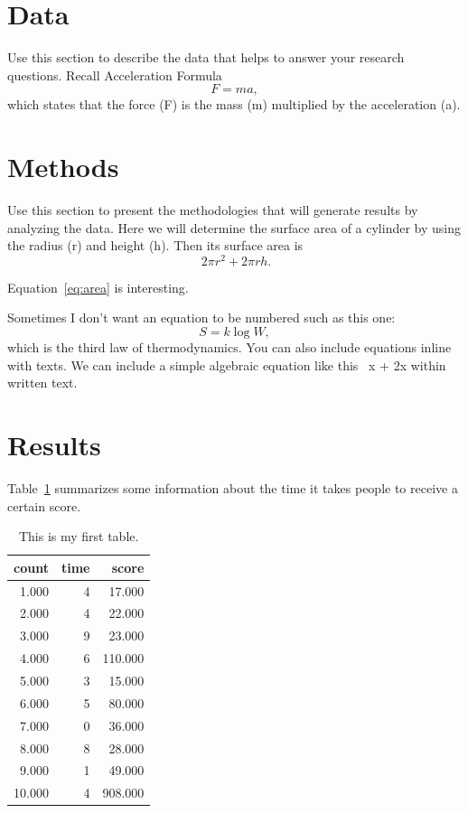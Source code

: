 \documentclass[12pt]{article}
\begin{document}
\section{Data}
\label{sec:data}

Use this section to describe the data that helps to answer your research
questions. Recall Acceleration Formula
\begin{equation}
  \label{eq:mc2}
  F = ma,
\end{equation}
which states that the force (F) is the mass (m) multiplied by the acceleration (a).

\section{Methods}
\label{sec:meth}

Use this section to present the methodologies that will generate results by
analyzing the data. Here we will determine the surface area of a cylinder by using the radius (r) and height (h). Then its surface area is
\begin{equation}
  \label{eq:area}
  \ 2\pi r^2 + 2\pi rh.
\end{equation}

Equation~\eqref{eq:area} is interesting. \lipsum[1-4]

Sometimes I don't want an equation to be numbered such as this one:
\[
S = k \log W,
\]
which is the third law of thermodynamics. You can also include equations inline with texts. We can include a simple algebraic equation like this \ x + 2x within written text.



\section{Results}
\label{sec:resu}

Table~\ref{tab:rv} summarizes some information about the time it takes people to receive a certain score.
\lipsum[1-4]

\begin{table}[ht]
  \caption{This is my first table.}
  \label{tab:rv}
\centering
\begin{tabular}{rrr}
  \hline
count & time & score \\ 
  \hline
1.000 & 4 & 17.000 \\ 
  2.000 & 4 & 22.000 \\ 
  3.000 & 9 & 23.000 \\ 
  4.000 & 6 & 110.000 \\ 
  5.000 & 3 & 15.000 \\ 
  6.000 & 5 & 80.000 \\ 
  7.000 & 0 & 36.000 \\ 
  8.000 & 8 & 28.000 \\ 
  9.000 & 1 & 49.000 \\ 
  10.000 & 4 & 908.000 \\ 
   \hline
\end{tabular}
\end{table}
\end{document}
